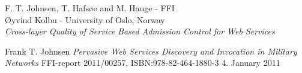 
\begin{thebibliography}{1}

    	F. T. Johnsen, T. Hafsøe and M. Hauge - FFI \\
		Øyvind Kolbu - University of Oslo, Norway \\
    	\emph{Cross-layer Quality of Service Based Admission Control for Web Services\\ }

    	Frank T. Johnsen
    	\emph{Pervasive Web Services Discovery and Invocation in Military Networks}
		FFI-report 2011/00257, ISBN:978-82-464-1880-3
        4. January 2011
        


\end{thebibliography}

